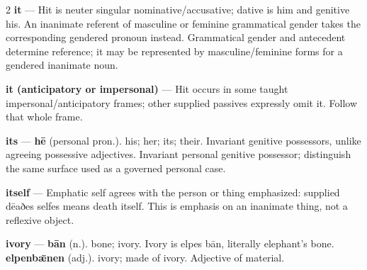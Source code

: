 \begin{multicols}{2}
\textbf{it} — Hit is neuter singular nominative/accusative; dative is him and genitive his. An inanimate referent of masculine or feminine grammatical gender takes the corresponding gendered pronoun instead. Grammatical gender and antecedent determine reference; it may be represented by masculine/feminine forms for a gendered inanimate noun.\par
\textbf{it (anticipatory or impersonal)} — Hit occurs in some taught impersonal/anticipatory frames; other supplied passives expressly omit it. Follow that whole frame.\par
\textbf{its} — \textbf{hē} (personal pron.). his; her; its; their. Invariant genitive possessors, unlike agreeing possessive adjectives. Invariant personal genitive possessor; distinguish the same surface used as a governed personal case.\par
\textbf{itself} — Emphatic self agrees with the person or thing emphasized: supplied dēaðes selfes means death itself. This is emphasis on an inanimate thing, not a reflexive object.\par
\textbf{ivory} — \textbf{bān} (n.). bone; ivory. Ivory is elpes bān, literally elephant's bone. \textbf{elpenbǣnen} (adj.). ivory; made of ivory. Adjective of material.\par

\end{multicols}
